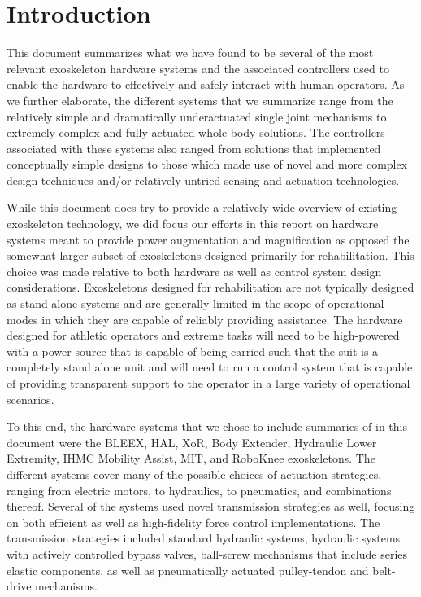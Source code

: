 \documentclass[letterpaper,12pt,fullpage]{article}
\begin{document}
\section{Introduction}

This document summarizes what we have found to be several of the most relevant exoskeleton hardware systems and the associated controllers used to enable the hardware to effectively and safely interact with human operators.  As we further elaborate, the different systems that we summarize range from the relatively simple and dramatically underactuated single joint mechanisms to extremely complex and fully actuated whole-body solutions.  The controllers associated with these systems also ranged from solutions that implemented conceptually simple designs to those which made use of novel and more complex design techniques and/or relatively untried sensing and actuation technologies. 

While this document does try to provide a relatively wide overview of existing exoskeleton technology, we did focus our efforts in this report on hardware systems meant to provide power augmentation and magnification as opposed the somewhat larger subset of exoskeletons designed primarily for rehabilitation.  This choice was made relative to both hardware as well as control system design considerations.  Exoskeletons designed for rehabilitation are not typically designed as stand-alone systems and are generally limited in the scope of operational modes in which they are capable of reliably providing assistance.  The hardware designed for athletic operators and extreme tasks will need to be high-powered with a power source that is capable of being carried such that the suit is a completely stand alone unit and will need to run a control system that is capable of providing transparent support to the operator in a large variety of operational scenarios.

To this end, the hardware systems that we chose to include summaries of in this document were the BLEEX, HAL, XoR, Body Extender, Hydraulic Lower Extremity, IHMC Mobility Assist, MIT, and RoboKnee exoskeletons.  The different systems cover many of the possible choices of actuation strategies, ranging from electric motors, to hydraulics, to pneumatics, and combinations thereof.  Several of the systems used novel transmission strategies as well, focusing on both efficient as well as high-fidelity force control implementations.  The transmission strategies included standard hydraulic systems, hydraulic systems with actively controlled bypass valves, ball-screw mechanisms that include series elastic components, as well as pneumatically actuated pulley-tendon and belt-drive mechanisms. 
\end{document}
